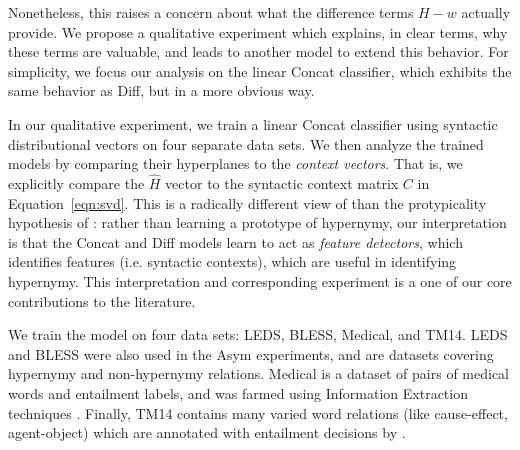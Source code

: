 \documentclass[12pt]{article}
\begin{document}
Nonetheless, this raises a concern about what the difference terms $H - w$
actually provide. We propose a qualitative experiment which explains, in
clear terms, why these terms are valuable, and leads to another model to
extend this behavior. For simplicity, we focus our analysis on the linear
Concat classifier, which exhibits the same behavior as Diff, but in a
more obvious way.

In our qualitative experiment, we train a linear Concat classifier using
syntactic distributional vectors on four separate data sets. We then analyze
the trained models by comparing their hyperplanes to the {\em context vectors}.
That is, we explicitly compare the $\hat H$ vector to the syntactic context
matrix $C$ in Equation~\ref{eqn:svd}. This is a radically
different view of than the protypicality hypothesis of
: rather than learning a prototype of hypernymy, our
interpretation is that the Concat and Diff models learn to act as {\em feature
detectors}, which identifies features (i.e. syntactic contexts), which are
useful in identifying hypernymy.  This interpretation and corresponding
experiment is a one of our core contributions to the literature.

We train the model on four data sets: LEDS, BLESS, Medical, and TM14. LEDS and BLESS
were also used in the Asym experiments, and are datasets covering hypernymy and
non-hypernymy relations. Medical is a dataset of pairs of medical words and
entailment labels, and was farmed using Information Extraction techniques
\cite{levy:2014:conll}. Finally, TM14 contains many varied word relations (like
cause-effect, agent-object) which are annotated with entailment decisions by
.
\end{document}
